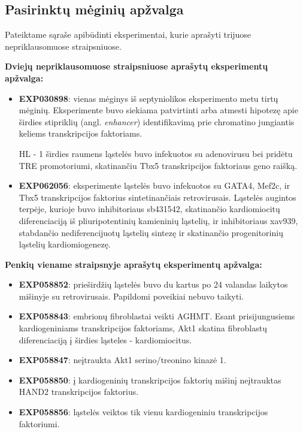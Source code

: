 \documentclass[12pt]{article}
\begin{document}
\subsection{Pasirinktų mėginių apžvalga}
Pateiktame sąraše apibūdinti eksperimentai, kurie aprašyti trijuose
nepriklausomuose straipsniuose.

\textbf{Dviejų nepriklausomuose straipsniuose aprašytų eksperimentų apžvalga:}
\begin{itemize}
    \item \textbf{EXP030898}: vienas mėginys iš septyniolikos eksperimento
        metu tirtų mėginių. Eksperimente buvo siekiama patvirtinti arba
        atmesti hipotezę apie širdies stipriklių (angl. \emph{enhancer})
        identifikavimą prie chromatino jungiantis keliems transkripcijos
        faktoriams.

        HL - 1 širdies raumens ląstelės buvo infekuotos su adenovirusu
        bei pridėtu TRE promotoriumi, skatinančiu Tbx5 transkripcijos
        faktoriaus geno raišką.
    \item \textbf{EXP062056}: eksperimente ląstelės buvo infekuotos su GATA4,
        Mef2c, ir Tbx5 transkripcijos faktorius sintetinančiais retrovirusais.
        Ląstelės augintos terpėje, kurioje buvo inhibitoriaus sb431542,
        skatinančio kardiomiocitų diferenciaciją iš pliuripotentinių
        kamieninių ląstelių, ir inhibitoriaus xav939, stabdančio
        nediferencijuotų ląstelių sintezę ir skatinančio progenitorinių
        ląstelių kardiomiogenezę.
\end{itemize}

\textbf{Penkių viename straipsnyje aprašytų eksperimentų apžvalga:}
\begin{itemize}
    \item \textbf{EXP058852}: prieširdžių ląstelės buvo du kartus po 24
    valandas laikytos mišinyje su retrovirusais. Papildomi poveikiai nebuvo
    taikyti.
    \item \textbf{EXP058843}: embrionų fibroblastai veikti AGHMT. Esant
        prisijungusiems kardiogeniniams transkripcijos faktoriams, Akt1
        skatina fibroblastų diferenciaciją į širdies ląsteles - kardiomiocitus.
    \item \textbf{EXP058847}: neįtraukta Akt1 serino/treonino kinazė 1.
    \item \textbf{EXP058850}: į kardiogeninių transkripcijos faktorių mišinį
        neįtrauktas HAND2 transkripcijos faktorius.
    \item \textbf{EXP058856}: ląstelės veiktos tik vienu kardiogeniniu 
        transkripcijos faktoriumi.
  \end{itemize}
\newpage
\end{document}
